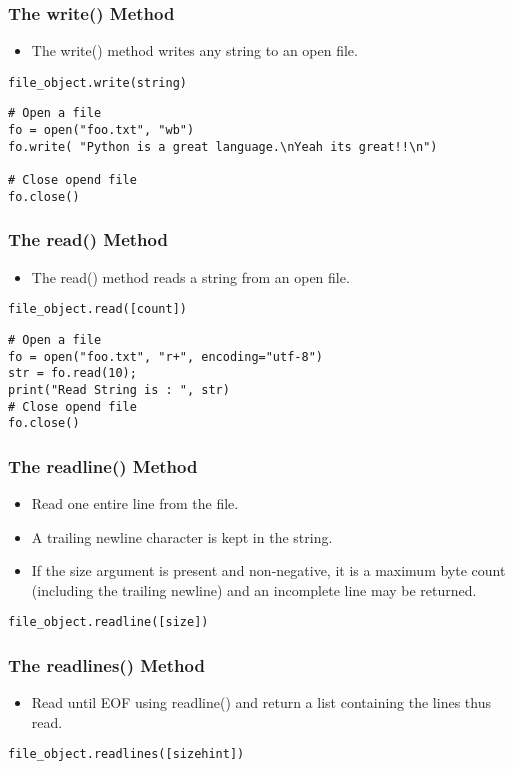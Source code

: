 \documentclass{../py-lecture}
\begin{document}
\begin{frame}[fragile]
	\frametitle{The write() Method}
  \begin{itemize}
    \item The write() method writes any string to an open file.
  \end{itemize}
  \begin{verbatim}
file_object.write(string)
  \end{verbatim}
  \begin{verbatim}
# Open a file
fo = open("foo.txt", "wb")
fo.write( "Python is a great language.\nYeah its great!!\n")

# Close opend file
fo.close()
  \end{verbatim}
\end{frame}

\begin{frame}[fragile]
	\frametitle{The read() Method}
  \begin{itemize}
    \item The read() method reads a string from an open file.
  \end{itemize}
  \begin{verbatim}
file_object.read([count])
  \end{verbatim}
  \begin{verbatim}
# Open a file
fo = open("foo.txt", "r+", encoding="utf-8")
str = fo.read(10);
print("Read String is : ", str)
# Close opend file
fo.close()
	\end{verbatim}
\end{frame}

\begin{frame}[fragile]
	\frametitle{The readline() Method}
  \begin{itemize}
    \item Read one entire line from the file.
    \item A trailing newline character is kept in the string.
    \item If the size argument is present and non-negative,
    it is a maximum byte count (including the trailing newline)
    and an incomplete line may be returned.
  \end{itemize}
  \begin{verbatim}
file_object.readline([size])
  \end{verbatim}
\end{frame}

\begin{frame}[fragile]
	\frametitle{The readlines() Method}
  \begin{itemize}
    \item Read until EOF using readline() and return a
      list containing the lines thus read.
  \end{itemize}
  \begin{verbatim}
file_object.readlines([sizehint])
  \end{verbatim}
\end{frame}
\end{document}
